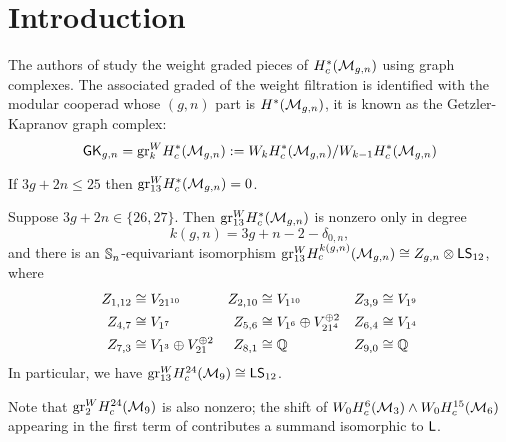 



\section{Introduction}

The authors of \cite{CLPW2} study the weight graded pieces of $H^*_c(\M_{g,n})$ using graph complexes. The associated graded of the weight filtration is identified with the modular cooperad whose $(g,n)$ part is $H^*(\M_{g,n})$, it is known as the Getzler-Kapranov graph complex:
\begin{equation}
    \GK_{g,n} =  \gr^W_k H^*_c(\M_{g,n}) := W_k H^*_c(\M_{g,n})/W_{k-1}H^*_c(\M_{g,n})
\end{equation}


\begin{prop}\label{prop:wt 13 vanishing}
    If $3g + 2n \leq 25$ then $\gr_{13}^W H^*_c(\M_{g,n}) = 0$.
\end{prop}

\begin{thm} \label{thm:lowexc13}
    Suppose $3g + 2n \in \{26, 27\}$. Then $\gr_{13}^W H^*_c(\M_{g,n})$ is nonzero only in degree $$k(g,n) = 3g + n - 2 - \delta_{0,n},$$ and there is an $\ss_n$-equivariant isomorphism $\gr_{13}^W H^{k(g,n)}_c(\cM_{g,n}) \cong Z_{g,n} \otimes \lstw$, where
\begin{align*}
    Z_{1,12} & \cong V_{21^{10}} & Z_{2,10} & \cong V_{1^{10}} & Z_{3,9} & \cong V_{1^{9}} \\
    Z_{4,7} & \cong V_{1^{7}} & Z_{5,6} & \cong V_{1^{6}} \oplus V_{21^4}^{\oplus 2} & Z_{6,4} & \cong V_{1^{4}} \\ Z_{7,3} & \cong V_{1^{3}} \oplus V_{21}^{\oplus 2}& Z_{8,1} & \cong \Q & Z_{9,0} & \cong \Q 
\end{align*}
In particular, we have $\gr_{13}^W H^{24}_c(\M_9) \cong \lstw$.
\end{thm}

\noindent  Note that  $\gr_2^W H^{24}_c(\M_9)$ is also nonzero; the shift of $W_0H^6_c(\M_3) \wedge W_0H^{15}_c(\M_6)$ appearing in the first term of  \cite[Theorem~1.2]{PayneWillwacher21} contributes a summand isomorphic to $\l$. 